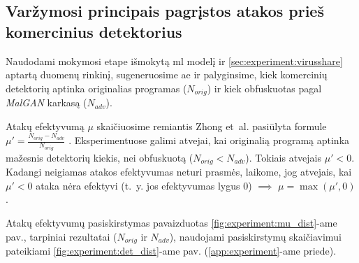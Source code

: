 \clearpage
\subsection{Varžymosi principais pagrįstos atakos prieš komercinius detektorius}

Naudodami mokymosi etape išmokytą \acs{ml} modelį ir
\ref{sec:experiment:virusshare} aptartą duomenų rinkinį, sugeneruosime \acs{ae}
ir palyginsime, kiek komercinių detektorių aptinka originalias programas
($N_{orig}$) ir kiek obfuskuotas pagal \textit{MalGAN} karkasą ($N_{adv}$).

Atakų efektyvumą $\mu$ skaičiuosime remiantis Zhong et~al. pasiūlyta formule
$\mu' = \frac{N_{orig} - N_{adv}}{N_{orig}}$
\cite{zhongMalFoxCamouflagedAdversarial2024}. Eksperimentuose galimi atvejai,
kai originalią programą aptinka mažesnis detektorių kiekis, nei obfuskuotą
($N_{orig} < N_{adv}$). Tokiais atvejais $\mu' < 0$. Kadangi neigiamas atakos
efektyvumas neturi prasmės, laikome, jog atvejais, kai $\mu' < 0$ ataka nėra
efektyvi (t.~y. jos efektyvumas lygus $0$) $\implies$ $\mu = \max{(\mu', 0)}$.

Atakų efektyvumų pasiskirstymas pavaizduotas \ref{fig:experiment:mu_dist}-ame
pav., tarpiniai rezultatai ($N_{orig}$ ir $N_{adv}$), naudojami pasiskirstymų
skaičiavimui pateikiami \ref{fig:experiment:det_dist}-ame pav.
(\ref{app:experiment}-ame priede).

